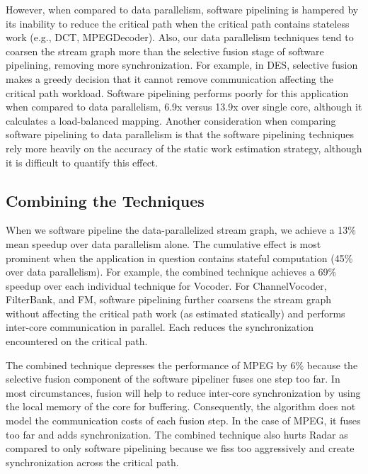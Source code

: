 However, when compared to data parallelism, software pipelining is
hampered by its inability to reduce the critical path when the
critical path contains stateless work (e.g., DCT, MPEGDecoder).  Also,
our data parallelism techniques tend to coarsen the stream graph more
than the selective fusion stage of software pipelining, removing more
synchronization.  For example, in DES, selective fusion makes a greedy
decision that it cannot remove communication affecting the critical
path workload.  Software pipelining performs poorly for this
application when compared to data parallelism, 6.9x versus 13.9x over
single core, although it calculates a load-balanced mapping.  Another
consideration when comparing software pipelining to data parallelism
is that the software pipelining techniques rely more heavily on the
accuracy of the static work estimation strategy, although it is
difficult to quantify this effect.

\subsection{Combining the Techniques}
When we software pipeline the data-parallelized stream graph, we
achieve a 13\% mean speedup over data parallelism alone. The
cumulative effect is most prominent when the application in question
contains stateful computation (45\% over data parallelism).  For
example, the combined technique achieves a 69\% speedup over each
individual technique for Vocoder. For ChannelVocoder, FilterBank, and
FM, software pipelining further coarsens the stream graph without
affecting the critical path work (as estimated statically) and
performs inter-core communication in parallel.  Each reduces the
synchronization encountered on the critical path.

The combined technique depresses the performance of MPEG by 6\%
because the selective fusion component of the software pipeliner fuses
one step too far.  In most circumstances, fusion will help to reduce
inter-core synchronization by using the local memory of the core for
buffering. Consequently, the algorithm does not model the
communication costs of each fusion step. In the case of MPEG, it fuses
too far and adds synchronization. The combined technique also hurts
Radar as compared to only software pipelining because we fiss too
aggressively and create synchronization across the critical path.


